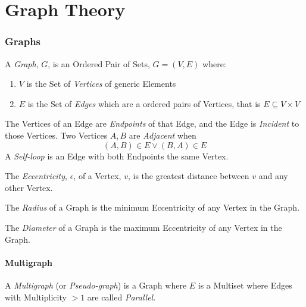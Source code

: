 \part{Graph Theory}

\section{Graphs} \label{sec:graphs}

A \emph{Graph}, $G$, is an Ordered Pair of Sets, $G = (V,E)$ where:
\begin{enumerate}
\item $V$ is the Set of \emph{Vertices} of generic Elements
\item $E$ is the Set of \emph{Edges} which are a ordered pairs of
  Vertices, that is $E \subseteq V \times V$
\end{enumerate}
The Vertices of an Edge are \emph{Endpoints} of that Edge, and the
Edge is \emph{Incident} to those Vertices. Two Vertices $A,B$ are
\emph{Adjacent} when
\[
    (A,B) \in E \vee (B,A) \in E
\]
A \emph{Self-loop} is an Edge with both Endpoints the same Vertex.

The \emph{Eccentricity}, $\epsilon$, of a Vertex, $v$, is the greatest
distance between $v$ and any other Vertex.

The \emph{Radius} of a Graph is the minimum Eccentricity of any
Vertex in the Graph.

The \emph{Diameter} of a Graph is the maximum Eccentricity of any
Vertex in the Graph.



\subsection{Multigraph} \label{sec:multigraph}

A \emph{Multigraph} (or \emph{Pseudo-graph}) is a Graph where $E$ is a
Multiset where Edges with Multiplicity $>1$ are called
\emph{Parallel}.



